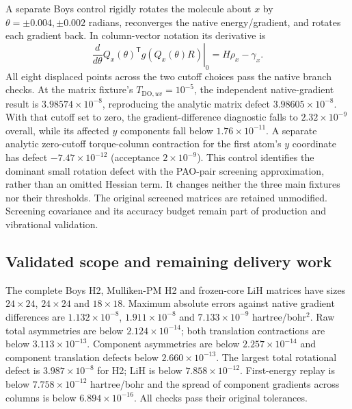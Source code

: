 \documentclass[11pt]{article}
\begin{document}
A separate Boys control rigidly rotates the molecule about $x$ by
$\theta=\pm0.004,\pm0.002$ radians, reconverges the native energy/gradient,
and rotates each gradient back. In column-vector notation its derivative is
\begin{equation}
 \left.\frac{d}{d\theta}
 Q_x(\theta)^{\mathsf T}g(Q_x(\theta)R)\right|_0
 =H\rho_x-\gamma_x.
\end{equation}
All eight displaced points across the two cutoff choices pass the native
branch checks. At the matrix fixture's $T_{\mathrm{DO},uv}=10^{-5}$,
the independent native-gradient result is $3.98574\times10^{-8}$,
reproducing the analytic matrix defect $3.98605\times10^{-8}$.
With that cutoff set to zero, the gradient-difference diagnostic falls to
$2.32\times10^{-9}$ overall, while its affected $y$ components fall below
$1.76\times10^{-11}$. A separate analytic zero-cutoff torque-column
contraction for the first atom's $y$ coordinate has defect
$-7.47\times10^{-12}$ (acceptance $2\times10^{-9}$).
This control identifies the dominant small rotation defect with the PAO-pair
screening approximation, rather than an omitted Hessian term. It changes
neither the three main fixtures nor their thresholds. The original
screened matrices are retained unmodified. Screening covariance and its
accuracy budget remain part of production and vibrational validation.

\subsection{Validated scope and remaining delivery work}
The complete Boys H2, Mulliken-PM H2 and frozen-core LiH matrices have
sizes $24\times24$, $24\times24$ and $18\times18$. Maximum absolute errors
against native gradient differences are $1.132\times10^{-8}$,
$1.911\times10^{-8}$ and $7.133\times10^{-9}$ hartree/bohr$^2$.
Raw total asymmetries are below $2.124\times10^{-14}$; both translation
contractions are below $3.113\times10^{-13}$.
Component asymmetries are below $2.257\times10^{-14}$ and component
translation defects below $2.660\times10^{-13}$. The largest total
rotational defect is $3.987\times10^{-8}$ for H2; LiH is below
$7.858\times10^{-12}$. First-energy replay is below $7.758\times10^{-12}$
hartree/bohr and the spread of component gradients across columns is
below $6.894\times10^{-16}$. All checks pass their original tolerances.
\end{document}
